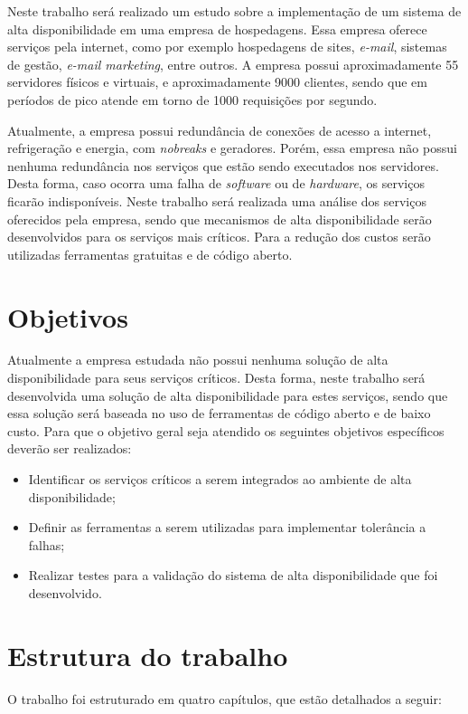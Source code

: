 Neste trabalho será realizado um estudo sobre a implementação de um sistema de alta disponibilidade em uma empresa de hospedagens. 
Essa empresa oferece serviços pela internet, como por exemplo hospedagens de sites, \textit{e-mail}, sistemas de gestão, \textit{e-mail marketing}, 
entre outros. A empresa possui aproximadamente 55 servidores físicos e virtuais, e aproximadamente 9000 clientes, 
sendo que em períodos de pico atende em torno de 1000 requisições por segundo. 

Atualmente, a empresa possui redundância de conexões de acesso a internet, refrigeração e energia, com \textit{nobreaks} e geradores. 
Porém, essa empresa não possui nenhuma redundância nos serviços que estão sendo executados nos servidores. Desta forma, caso ocorra 
uma falha de \textit{software} ou de \textit{hardware}, os serviços ficarão indisponíveis. Neste trabalho será realizada uma análise dos 
serviços oferecidos pela empresa, sendo que mecanismos de alta disponibilidade serão desenvolvidos para os serviços mais críticos. 
Para a redução dos custos serão utilizadas ferramentas gratuitas e de código aberto.

\section{Objetivos}
Atualmente a empresa estudada não possui nenhuma solução de alta disponibilidade para seus serviços críticos. Desta forma, neste trabalho 
será desenvolvida uma solução de alta disponibilidade para estes serviços, sendo que essa solução será baseada no uso de ferramentas de 
código aberto e de baixo custo. Para que o objetivo geral seja atendido os seguintes objetivos específicos deverão ser realizados:

\begin{itemize}
\item Identificar os serviços críticos a serem integrados ao ambiente de alta disponibilidade;
\item Definir as ferramentas a serem utilizadas para implementar tolerância a falhas;
\item Realizar testes para a validação do sistema de alta disponibilidade que foi desenvolvido.
\end{itemize}

\section{Estrutura do trabalho}
O trabalho foi estruturado em quatro capítulos, que estão detalhados a seguir:


